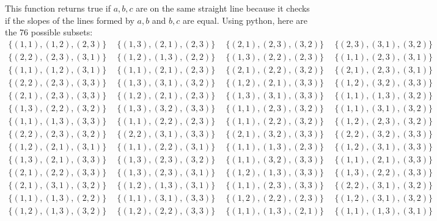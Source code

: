 \documentclass[a4paper]{article}
\begin{document}
\begin{enumerate}
\begin{enumerate}
        This function returns true if $a, b, c$ are on the same straight line because it checks if the slopes of the lines formed by $a, b$ and $b, c$ are equal. Using python, here are the 76 possible subsets:
        \begin{align*}
            \{(1, 1), (1, 2), (2, 3)\}\ & \ \{(1, 3), (2, 1), (2, 3)\}\ & \ \{(2, 1), (2, 3), (3, 2)\}\ & \ \{(2, 3), (3, 1), (3, 2)\}\\
            \{(2, 2), (2, 3), (3, 1)\}\ & \ \{(1, 2), (1, 3), (2, 2)\}\ & \ \{(1, 3), (2, 2), (2, 3)\}\ & \ \{(1, 1), (2, 3), (3, 1)\}\\
            \{(1, 1), (1, 2), (3, 1)\}\ & \ \{(1, 1), (2, 1), (2, 3)\}\ & \ \{(2, 1), (2, 2), (3, 2)\}\ & \ \{(2, 1), (2, 3), (3, 1)\}\\
            \{(2, 2), (2, 3), (3, 3)\}\ & \ \{(1, 3), (3, 1), (3, 2)\}\ & \ \{(1, 2), (2, 1), (3, 3)\}\ & \ \{(1, 2), (3, 2), (3, 3)\}\\
            \{(2, 1), (2, 3), (3, 3)\}\ & \ \{(1, 2), (2, 1), (2, 3)\}\ & \ \{(1, 3), (3, 1), (3, 3)\}\ & \ \{(1, 1), (1, 3), (3, 2)\}\\
            \{(1, 3), (2, 2), (3, 2)\}\ & \ \{(1, 3), (3, 2), (3, 3)\}\ & \ \{(1, 1), (2, 3), (3, 2)\}\ & \ \{(1, 1), (3, 1), (3, 2)\}\\
            \{(1, 1), (1, 3), (3, 3)\}\ & \ \{(1, 1), (2, 2), (2, 3)\}\ & \ \{(1, 1), (2, 2), (3, 2)\}\ & \ \{(1, 2), (2, 3), (3, 2)\}\\
            \{(2, 2), (2, 3), (3, 2)\}\ & \ \{(2, 2), (3, 1), (3, 3)\}\ & \ \{(2, 1), (3, 2), (3, 3)\}\ & \ \{(2, 2), (3, 2), (3, 3)\}\\
            \{(1, 2), (2, 1), (3, 1)\}\ & \ \{(1, 1), (2, 2), (3, 1)\}\ & \ \{(1, 1), (1, 3), (2, 3)\}\ & \ \{(1, 2), (3, 1), (3, 3)\}\\
            \{(1, 3), (2, 1), (3, 3)\}\ & \ \{(1, 3), (2, 3), (3, 2)\}\ & \ \{(1, 1), (3, 2), (3, 3)\}\ & \ \{(1, 1), (2, 1), (3, 3)\}\\
            \{(2, 1), (2, 2), (3, 3)\}\ & \ \{(1, 3), (2, 3), (3, 1)\}\ & \ \{(1, 2), (1, 3), (3, 3)\}\ & \ \{(1, 3), (2, 2), (3, 3)\}\\
            \{(2, 1), (3, 1), (3, 2)\}\ & \ \{(1, 2), (1, 3), (3, 1)\}\ & \ \{(1, 1), (2, 3), (3, 3)\}\ & \ \{(2, 2), (3, 1), (3, 2)\}\\
            \{(1, 1), (1, 3), (2, 2)\}\ & \ \{(1, 1), (3, 1), (3, 3)\}\ & \ \{(1, 2), (2, 2), (2, 3)\}\ & \ \{(1, 2), (3, 1), (3, 2)\}\\
            \{(1, 2), (1, 3), (3, 2)\}\ & \ \{(1, 2), (2, 2), (3, 3)\}\ & \ \{(1, 1), (1, 3), (2, 1)\}\ & \ \{(1, 1), (1, 3), (3, 1)\}\\

\end{align*}
\end{enumerate}
\end{enumerate}
\end{document}
